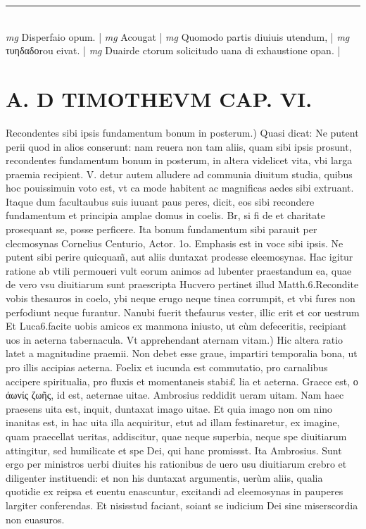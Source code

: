 \documentclass{article}
\begin{document}
\begin{pages}
\vspace{0.5cm}\noindent
\vspace{0.2cm}\rule{1cm}{0.2pt}\\ 
\hspace{0.2cm}\textit{mg}
\footnotesize Disperfaio opum. 
\normalsize| 
\hspace{0.2cm}\textit{mg}
\footnotesize Acougat 
\normalsize| 
\hspace{0.2cm}\textit{mg}
\footnotesize Quomodo partis diuiuis utendum, 
\normalsize| 
\hspace{0.2cm}\textit{mg}
\footnotesize τυηδαδοrou eivat. 
\normalsize| 
\hspace{0.2cm}\textit{mg}
\footnotesize Duairde ctorum solicitudo uana di exhaustione opan. 
\normalsize| 
\section*{A. D TIMOTHEVM CAP. VI. }
\marginpar{[ p.134 ]}\pstart Recondentes sibi ipsis fundamentum bonum in posterum.) Quasi dicat: Ne putent perii quod in alios conserunt: nam reuera non tam aliis, quam sibi ipsis prosunt, recondentes fundamentum bonum in posterum, in altera videlicet vita, vbi larga praemia recipient. V. detur autem alludere ad communia diuitum studia, quibus hoc pouissimuin voto est, vt ca mode habitent ac magnificas aedes sibi extruant. Itaque dum facultaubus suis iuuant paus peres, dicit, eos sibi recondere fundamentum et principia amplae domus in coelis. Br, si fi de et charitate prosequant se, posse perficere. Ita bonum fundamentum sibi parauit per clecmosynas Cornelius Centurio, Actor. 1o. Emphasis est in voce sibi ipsis. Ne putent sibi perire quicquam̃, aut aliis duntaxat prodesse eleemosynas. Hac igitur ratione ab vtili permoueri vult eorum animos ad lubenter praestandum ea, quae de vero vsu diuitiarum sunt praescripta Hucvero pertinet illud Matth.6.Recondite vobis thesauros in coelo, ybi neque erugo neque tinea corrumpit, et vbi fures non perfodiunt neque furantur. Nanubi fuerit thefaurus vester, illic erit et cor uestrum Et Luca6.facite uobis amicos ex manmona iniusto, ut cùm defeceritis, recipiant uos in aeterna tabernacula.  \pend\pstart Vt apprehendant aternam vitam.) Hic altera ratio latet a magnitudine praemii. Non debet esse graue, impartiri temporalia bona, ut pro illis accipias aeterna. Foelix et iucunda est commutatio, pro carnalibus accipere spiritualia, pro fluxis et momentaneis stabi£ lia et aeterna. Graece est, ο ἀωνίς ζωῆς, id est, aeternae uitae. Ambrosius reddidit ueram uitam. Nam haec praesens uita est, inquit, duntaxat imago uitae. Et quia imago non om nino inanitas est, in hac uita illa acquiritur, etut ad illam festinaretur, ex imagine, quam praecellat ueritas, addiscitur, quae neque superbia, neque spe diuitiarum attingitur, sed humilicate et spe Dei, qui hanc promissst. Ita Ambrosius. Sunt ergo per ministros uerbi diuites his rationibus de uero usu diuitiarum crebro et diligenter instituendi: et non his duntaxat argumentis, uerùm aliis, qualia quotidie ex reipsa et euentu enascuntur, excitandi ad eleemosynas in pauperes largiter conferendas. Et nisisstud faciant, soiant se iudicium Dei sine miserscordia non euasuros.  \pend

\end{pages}
\end{document}
